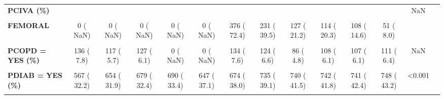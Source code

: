 \documentclass[
]{article}
\begin{document}
\begin{table}[H]
\begin{tabular}[t]{>{\raggedright\arraybackslash}p{5em}ccccccccccccc}
\textbf{PCIVA (\%)} &  &  &  &  &  &  &  &  &  &  &  & NaN & \\
\textbf{\cellcolor{gray!10}{BOTH}} & \cellcolor{gray!10}{0 (  NaN)} & \cellcolor{gray!10}{0 (  NaN)} & \cellcolor{gray!10}{0 (  NaN)} & \cellcolor{gray!10}{0 (  NaN)} & \cellcolor{gray!10}{0 (  NaN)} & \cellcolor{gray!10}{0 (  0.0)} & \cellcolor{gray!10}{0 (  0.0)} & \cellcolor{gray!10}{9 (  1.5)} & \cellcolor{gray!10}{9 (  1.6)} & \cellcolor{gray!10}{11 (  1.5)} & \cellcolor{gray!10}{6 (  0.9)} & \cellcolor{gray!10}{} & \cellcolor{gray!10}{}\\
\textbf{FEMORAL} & 0 (  NaN) & 0 (  NaN) & 0 (  NaN) & 0 (  NaN) & 0 (  NaN) & 376 ( 72.4) & 231 ( 39.5) & 127 ( 21.2) & 114 ( 20.3) & 108 ( 14.6) & 51 (  8.0) &  & \\
\textbf{\cellcolor{gray!10}{RADIAL}} & \cellcolor{gray!10}{0 (  NaN)} & \cellcolor{gray!10}{0 (  NaN)} & \cellcolor{gray!10}{0 (  NaN)} & \cellcolor{gray!10}{0 (  NaN)} & \cellcolor{gray!10}{0 (  NaN)} & \cellcolor{gray!10}{143 ( 27.6)} & \cellcolor{gray!10}{354 ( 60.5)} & \cellcolor{gray!10}{462 ( 77.3)} & \cellcolor{gray!10}{438 ( 78.1)} & \cellcolor{gray!10}{620 ( 83.9)} & \cellcolor{gray!10}{582 ( 91.1)} & \cellcolor{gray!10}{} & \cellcolor{gray!10}{}\\
\textbf{PCOPD = YES (\%)} & 136 (  7.8) & 117 (  5.7) & 127 (  6.1) & 0 (  NaN) & 0 (  NaN) & 134 (  7.6) & 124 (  6.6) & 86 (  4.8) & 108 (  6.1) & 107 (  6.1) & 111 (  6.4) & NaN & \\
\textbf{\cellcolor{gray!10}{PCVA = YES (\%)}} & \cellcolor{gray!10}{126 (  7.2)} & \cellcolor{gray!10}{176 (  8.6)} & \cellcolor{gray!10}{170 (  8.1)} & \cellcolor{gray!10}{181 (  8.8)} & \cellcolor{gray!10}{120 (  6.9)} & \cellcolor{gray!10}{145 (  8.2)} & \cellcolor{gray!10}{158 (  8.4)} & \cellcolor{gray!10}{146 (  8.2)} & \cellcolor{gray!10}{164 (  9.2)} & \cellcolor{gray!10}{154 (  8.8)} & \cellcolor{gray!10}{158 (  9.1)} & \cellcolor{gray!10}{0.257} & \cellcolor{gray!10}{}\\
\textbf{PDIAB = YES (\%)} & 567 ( 32.2) & 654 ( 31.9) & 679 ( 32.4) & 690 ( 33.4) & 647 ( 37.1) & 674 ( 38.0) & 735 ( 39.1) & 740 ( 41.5) & 742 ( 41.8) & 741 ( 42.4) & 748 ( 43.2) & <0.001 & \\
\textbf{\cellcolor{gray!10}{PDIABT = TYPE 2 (\%)}} & \cellcolor{gray!10}{0 (  NaN)} & \cellcolor{gray!10}{519 ( 91.5)} & \cellcolor{gray!10}{0 (  NaN)} & \cellcolor{gray!10}{607 ( 91.3)} & \cellcolor{gray!10}{617 ( 97.6)} & \cellcolor{gray!10}{638 ( 96.8)} & \cellcolor{gray!10}{729 ( 98.5)} & \cellcolor{gray!10}{742 ( 99.1)} & \cellcolor{gray!10}{742 ( 98.7)} & \cellcolor{gray!10}{729 ( 99.0)} & \cellcolor{gray!10}{681 ( 97.6)} & \cellcolor{gray!10}{NaN} & \cellcolor{gray!10}{}\\

\end{tabular}
\end{table}
\end{document}
